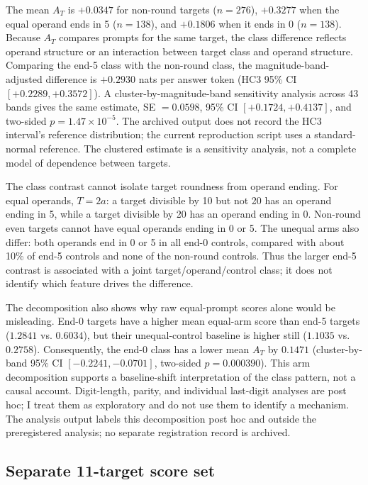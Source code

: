 \documentclass[11pt]{article}
\begin{document}
The mean $A_T$ is $+0.0347$ for non-round targets ($n=276$), $+0.3277$ when the equal operand ends in 5 ($n=138$), and $+0.1806$ when it ends in 0 ($n=138$). Because $A_T$ compares prompts for the same target, the class difference reflects operand structure or an interaction between target class and operand structure. Comparing the end-5 class with the non-round class, the magnitude-band-adjusted difference is $+0.2930$ nats per answer token (HC3 95\% CI $[+0.2289,+0.3572]$). A cluster-by-magnitude-band sensitivity analysis across 43 bands gives the same estimate, SE $=0.0598$, 95\% CI $[+0.1724,+0.4137]$, and two-sided $p=1.47\times10^{-5}$. The archived output does not record the HC3 interval's reference distribution; the current reproduction script uses a standard-normal reference. The clustered estimate is a sensitivity analysis, not a complete model of dependence between targets.

The class contrast cannot isolate target roundness from operand ending. For equal operands, $T=2a$: a target divisible by 10 but not 20 has an operand ending in 5, while a target divisible by 20 has an operand ending in 0. Non-round even targets cannot have equal operands ending in 0 or 5. The unequal arms also differ: both operands end in 0 or 5 in all end-0 controls, compared with about 10\% of end-5 controls and none of the non-round controls. Thus the larger end-5 contrast is associated with a joint target/operand/control class; it does not identify which feature drives the difference.

The decomposition also shows why raw equal-prompt scores alone would be misleading. End-0 targets have a higher mean equal-arm score than end-5 targets ($1.2841$ vs. $0.6034$), but their unequal-control baseline is higher still ($1.1035$ vs. $0.2758$). Consequently, the end-0 class has a lower mean $A_T$ by $0.1471$ (cluster-by-band 95\% CI $[-0.2241,-0.0701]$, two-sided $p=0.000390$). This arm decomposition supports a baseline-shift interpretation of the class pattern, not a causal account. Digit-length, parity, and individual last-digit analyses are post hoc; I treat them as exploratory and do not use them to identify a mechanism. The analysis output labels this decomposition post hoc and outside the preregistered analysis; no separate registration record is archived.

\subsection{Separate 11-target score set}
\end{document}
